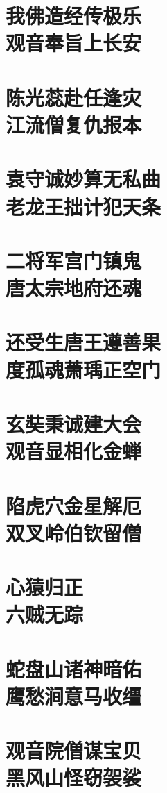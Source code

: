 \documentclass[a4paper,12pt,UTF8,twoside]{ctexbook}
\begin{document}
\chapter[我佛造经传极乐\ 观音奉旨上长安]{我佛造经传极乐\\观音奉旨上长安}
\chapter[陈光蕊赴任逢灾\ 江流僧复仇报本]{陈光蕊赴任逢灾\\江流僧复仇报本}
\chapter[袁守诚妙算无私曲\ 老龙王拙计犯天条]{袁守诚妙算无私曲\\老龙王拙计犯天条}
\chapter[二将军宫门镇鬼\ 唐太宗地府还魂]{二将军宫门镇鬼\\唐太宗地府还魂}
\chapter[还受生唐王遵善果\ 度孤魂萧瑀正空门]{还受生唐王遵善果\\度孤魂萧瑀正空门}
\chapter[玄奘秉诚建大会\ 观音显相化金蝉]{玄奘秉诚建大会\\观音显相化金蝉}
\chapter[陷虎穴金星解厄\ 双叉岭伯钦留僧]{陷虎穴金星解厄\\双叉岭伯钦留僧}
\chapter[心猿归正\ 六贼无踪]{心猿归正\\六贼无踪}
\chapter[蛇盘山诸神暗佑\ 鹰愁涧意马收缰]{蛇盘山诸神暗佑\\鹰愁涧意马收缰}
\chapter[观音院僧谋宝贝\ 黑风山怪窃袈裟]{观音院僧谋宝贝\\黑风山怪窃袈裟}
\end{document}
